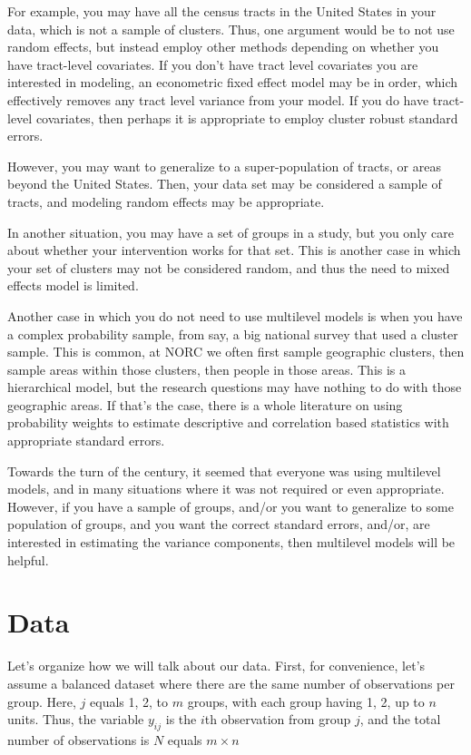 For example, you may have all the census tracts in the United States in your data, which is not a sample of clusters. Thus, one argument would be to not use random effects, but instead employ other methods depending on whether you have tract-level covariates. If you don't have tract level covariates you are interested in modeling, an econometric fixed effect model may be in order, which effectively removes any tract level variance from your model. If you do have tract-level covariates, then perhaps it is appropriate to employ cluster robust standard errors.

However, you may want to generalize to a super-population of tracts, or areas beyond the United States.  Then, your data set may be considered a sample of tracts, and modeling random effects may be appropriate.

In another situation, you may have a set of groups in a study, but you only care about whether your intervention works for that set. This is another case in which your set of clusters may not be considered random, and thus the need to mixed effects model is limited.

Another case in which you do not need to use multilevel models is when you have a complex probability sample, from say, a big national survey that used a cluster sample.  This is common, at NORC we often first sample geographic clusters, then sample areas within those clusters, then people in those areas. This is a hierarchical model, but the research questions may have nothing to do with those geographic areas. If that's the case, there is a whole literature on using probability weights to estimate descriptive and correlation based statistics with appropriate standard errors.

Towards the turn of the century, it seemed that everyone was using multilevel models, and in many situations where it was not required or even appropriate. However, if you have a sample of groups, and/or you want to generalize to some population of groups, and you want the correct standard errors, and/or, are interested in estimating the variance components, then multilevel models will be helpful.


\section{Data}

Let's organize how we will talk about our data. First, for convenience, let's assume a balanced dataset where there are the same number of observations per group. Here, $j$ equals 1, 2, to $m$ groups, with each group having 1, 2, up to $n$ units. Thus, the variable $y_{ij}$ is the $i$th observation from group $j$, and the total number of observations is $N$ equals $m \times n$


